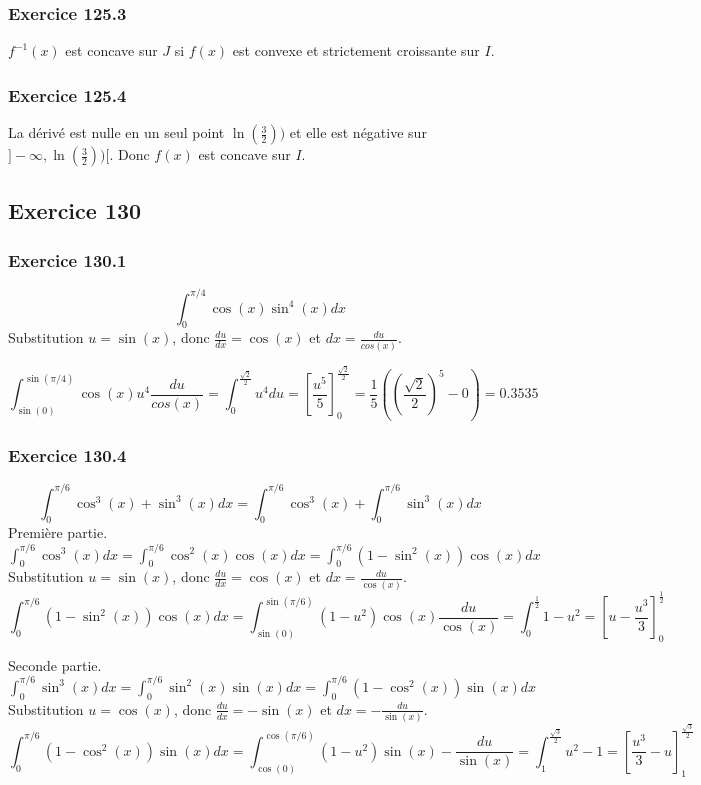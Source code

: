 \documentclass[]{book}
\theoremstyle{definition}
\begin{document}
\subsubsection*{Exercice 125.3}
$f^{-1}(x)$ est concave sur $J$ si $f(x)$ est convexe et strictement croissante sur $I$. 

\subsubsection*{Exercice 125.4}
La d\'eriv\'e est nulle en un seul point $\ln(\frac{3}{2}))$ et elle est n\'egative sur $]-\infty,\ln(\frac{3}{2}))[$. Donc $f(x)$ est concave sur $I$.

\subsection*{Exercice 130}
\subsubsection*{Exercice 130.1}
$$\int_{0}^{\pi/4}{\cos(x)\sin^4(x)dx}$$
Substitution $u=\sin(x)$, donc $\frac{du}{dx} = \cos(x)$ et $dx=\frac{du}{cos(x)}$.

$$\int_{\sin(0)}^{\sin(\pi/4)}{\cos(x)u^4 \frac{du}{cos(x)}} = \int_{0}^{\frac{\sqrt{2}}{2}}{u^4 du} = \left[ \frac{u^5}{5} \right]_{0}^{\frac{\sqrt{2}}{2}} = \frac{1}{5}((\frac{\sqrt{2}}{2})^5 -0) = 0.3535$$

\subsubsection*{Exercice 130.4}
$$\int_{0}^{\pi/6}{\cos^3(x) + \sin^3(x)dx} = \int_{0}^{\pi/6}{\cos^3(x)} + \int_{0}^{\pi/6}{\sin^3(x)dx}$$
Premi\`ere partie. $\int_{0}^{\pi/6}{\cos^3(x)dx} = \int_{0}^{\pi/6}{\cos^2(x)\cos(x)dx} = \int_{0}^{\pi/6}{(1-\sin^2(x))\cos(x)dx}$
Substitution $u=\sin(x)$, donc $\frac{du}{dx} = \cos(x)$ et $dx= \frac{du}{\cos(x)}$.
$$\int_{0}^{\pi/6}{(1-\sin^2(x))\cos(x)dx} =  \int_{\sin(0)}^{\sin(\pi/6)}{(1-u^2)\cos(x) \frac{du}{\cos(x)}} = \int_{0}^{\frac{1}{2}}{1-u^2} = \left[u-\frac{u^3}{3}\right]_{0}^{\frac{1}{2}}$$

Seconde partie. $\int_{0}^{\pi/6}{\sin^3(x)dx} = \int_{0}^{\pi/6}{\sin^2(x)\sin(x)dx} = \int_{0}^{\pi/6}{(1-\cos^2(x))\sin(x)dx}$
Substitution $u=\cos(x)$, donc $\frac{du}{dx} = -\sin(x)$ et $dx= -\frac{du}{\sin(x)}$.
$$\int_{0}^{\pi/6}{(1-\cos^2(x))\sin(x)dx} =  \int_{\cos(0)}^{\cos(\pi/6)}{(1-u^2)\sin(x) -\frac{du}{\sin(x)}} = \int_{1}^{\frac{\sqrt{3}}{2}}{u^2-1} = \left[\frac{u^3}{3}-u\right]_{1}^{\frac{\sqrt{3}}{2}}$$
\end{document}
